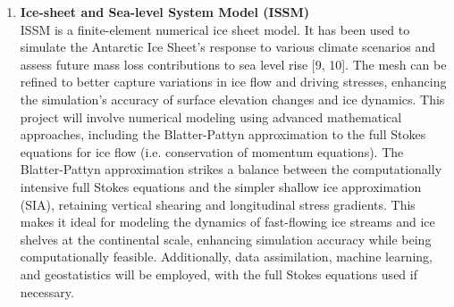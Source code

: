 \begin{enumerate}
    \item\textbf{Ice-sheet and Sea-level System Model (ISSM)}~\cite{ISSM}\\
    ISSM is a finite-element numerical ice sheet model. It has been used to simulate the Antarctic Ice Sheet’s response to various climate scenarios and assess future mass loss contributions to sea level rise [9, 10]. The mesh can be refined to better capture variations in ice flow and driving stresses, enhancing the simulation’s accuracy of surface elevation changes and ice dynamics. This project will involve numerical modeling using advanced mathematical approaches, including the Blatter-Pattyn approximation to the full Stokes equations for ice flow (i.e. conservation of momentum equations). The Blatter-Pattyn approximation strikes a balance between the computationally intensive full Stokes equations and the simpler shallow ice approximation (SIA), retaining vertical shearing and longitudinal stress gradients. This makes it ideal for modeling the dynamics of fast-flowing ice streams and ice shelves at the continental scale, enhancing simulation accuracy while being computationally feasible. Additionally, data assimilation, machine learning, and geostatistics will be employed, with the full Stokes equations used if necessary.
\end{enumerate}